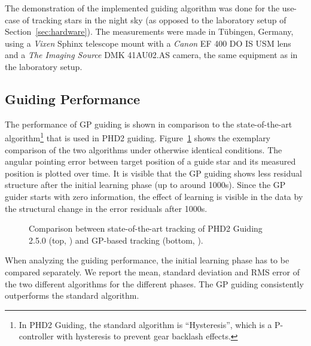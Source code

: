 The demonstration of the implemented guiding algorithm was done for the
use-case of tracking stars in the night sky (as opposed to the laboratory setup
of Section~\ref{sec:hardware}). The measurements were made in T{\"u}bingen,
Germany, using a \emph{Vixen} Sphinx telescope mount with a \emph{Canon} EF 400
DO IS USM lens and a \emph{The Imaging Source} DMK 41AU02.AS camera, the same
equipment as in the laboratory setup.

\subsection{Guiding Performance}

The performance of GP guiding is shown in comparison to the state-of-the-art
algorithm\footnote{In PHD2 Guiding, the standard algorithm is ``Hysteresis'',
which is a P-controller with hysteresis to prevent gear backlash effects.} that
is used in PHD2 guiding. Figure~\ref{fig:comparison-sota} shows the exemplary
comparison of the two algorithms under otherwise identical conditions. The
angular pointing error between target position of a guide star and its measured
position is plotted over time. It is visible that the GP guiding shows less
residual structure after the initial learning phase (up to around
1000\unit{s}). Since the GP guider starts with zero information, the effect of
learning is visible in the data by the structural change in the error residuals
after 1000\unit{s}.

\begin{figure}
\setlength{\figurewidth}{0.95\textwidth}%
\setlength{\figureheight}{0.4\textwidth}%
\footnotesize
{}
\caption[Comparison between state-of-the-art tracking
and GP-based tracking.]{Comparison between state-of-the-art tracking
of PHD2 Guiding 2.5.0 (top, ) and GP-based tracking
(bottom, ).}
\label{fig:comparison-sota}
\end{figure}

When analyzing the guiding performance, the initial learning phase has to be
compared separately. We report the mean, standard deviation and RMS error of the
two different algorithms for the different phases. The GP guiding consistently
outperforms the standard algorithm.

